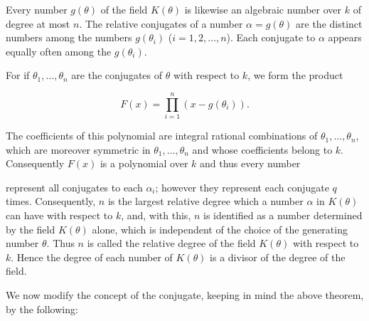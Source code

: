 Every number $g(\theta)$ of the field $K(\theta)$ is likewise an algebraic number over $k$ of degree at most $n$. The relative conjugates of a number $\alpha = g(\theta)$ are the distinct numbers among the numbers $g(\theta_i)$ ($i = 1, 2, \ldots, n$). Each conjugate to $\alpha$ appears equally often among the $g(\theta_i)$.

For if $\theta_1, \ldots, \theta_n$ are the conjugates of $\theta$ with respect to $k$, we form the product

$$F(x) = \prod_{i=1}^{n} (x - g(\theta_i)).$$

The coefficients of this polynomial are integral rational combinations of $\theta_1, \ldots, \theta_n$, which are moreover symmetric in $\theta_1, \ldots, \theta_n$ and whose coefficients belong to $k$. Consequently $F(x)$ is a polynomial over $k$ and thus every number

represent all conjugates to each $\alpha_i$; however they represent each conjugate $q$ times. Consequently, $n$ is the largest relative degree which a number $\alpha$ in $K(\theta)$ can have with respect to $k$, and, with this, $n$ is identified as a number determined by the field $K(\theta)$ alone, which is independent of the choice of the generating number $\theta$. Thus $n$ is called the relative degree of the field $K(\theta)$ with respect to $k$. Hence the degree of each number of $K(\theta)$ is a divisor of the degree of the field.

We now modify the concept of the conjugate, keeping in mind the above theorem, by the following:
